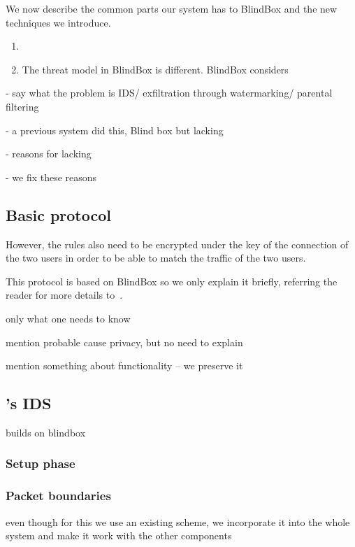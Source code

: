 We now describe the common parts our system has to BlindBox and the new techniques we introduce. 



\begin{enumerate}
\item  \item The threat model in BlindBox is different. BlindBox considers 
\end{enumerate}

- say what the problem is IDS/ exfiltration through watermarking/ parental filtering

- a previous system did this, Blind box but lacking

- reasons for lacking

- we fix these reasons

\subsection{Basic protocol}

However, the rules also need to be encrypted
under the key of the connection of the two users in order to be able to match the 
traffic of the two users. 

This protocol is based on BlindBox so we only explain it briefly, referring the reader for more details to~\cite{blindbox}. 


only what one needs to know

mention probable cause privacy, but no need to explain

mention something about functionality -- we preserve it

\subsection{\sys's IDS}

builds on blindbox

\subsubsection{Setup phase}


\subsubsection{Packet boundaries}



even though for this we use an existing scheme, we incorporate it into the whole
system and make it work with the other components

